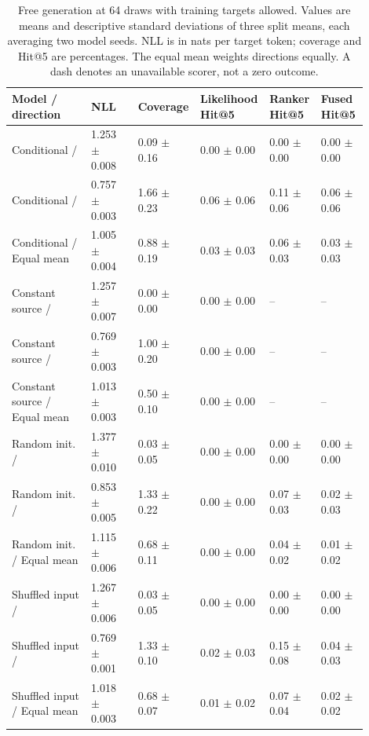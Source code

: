 \begin{table}[ht]
\centering
\caption{Free generation at 64 draws with training targets allowed. Values are means and descriptive standard deviations of three split means, each averaging two model seeds. NLL is in nats per target token; coverage and Hit@5 are percentages. The equal mean weights directions equally. A dash denotes an unavailable scorer, not a zero outcome.}
\label{tab:primary}
\small
\setlength{\tabcolsep}{3pt}
\begin{tabular}{p{0.2200\linewidth}p{0.1360\linewidth}p{0.1360\linewidth}p{0.1360\linewidth}p{0.1360\linewidth}p{0.1360\linewidth}}
\toprule
Model / direction & NLL & Coverage & Likelihood Hit@5 & Ranker Hit@5 & Fused Hit@5\\
\midrule
Conditional / \gtd{} & 1.253 $\pm$ 0.008 & 0.09 $\pm$ 0.16 & 0.00 $\pm$ 0.00 & 0.00 $\pm$ 0.00 & 0.00 $\pm$ 0.00\\
Conditional / \dtg{} & 0.757 $\pm$ 0.003 & 1.66 $\pm$ 0.23 & 0.06 $\pm$ 0.06 & 0.11 $\pm$ 0.06 & 0.06 $\pm$ 0.06\\
Conditional / Equal mean & 1.005 $\pm$ 0.004 & 0.88 $\pm$ 0.19 & 0.03 $\pm$ 0.03 & 0.06 $\pm$ 0.03 & 0.03 $\pm$ 0.03\\
Constant source / \gtd{} & 1.257 $\pm$ 0.007 & 0.00 $\pm$ 0.00 & 0.00 $\pm$ 0.00 & -- & --\\
Constant source / \dtg{} & 0.769 $\pm$ 0.003 & 1.00 $\pm$ 0.20 & 0.00 $\pm$ 0.00 & -- & --\\
Constant source / Equal mean & 1.013 $\pm$ 0.003 & 0.50 $\pm$ 0.10 & 0.00 $\pm$ 0.00 & -- & --\\
Random init. / \gtd{} & 1.377 $\pm$ 0.010 & 0.03 $\pm$ 0.05 & 0.00 $\pm$ 0.00 & 0.00 $\pm$ 0.00 & 0.00 $\pm$ 0.00\\
Random init. / \dtg{} & 0.853 $\pm$ 0.005 & 1.33 $\pm$ 0.22 & 0.00 $\pm$ 0.00 & 0.07 $\pm$ 0.03 & 0.02 $\pm$ 0.03\\
Random init. / Equal mean & 1.115 $\pm$ 0.006 & 0.68 $\pm$ 0.11 & 0.00 $\pm$ 0.00 & 0.04 $\pm$ 0.02 & 0.01 $\pm$ 0.02\\
Shuffled input / \gtd{} & 1.267 $\pm$ 0.006 & 0.03 $\pm$ 0.05 & 0.00 $\pm$ 0.00 & 0.00 $\pm$ 0.00 & 0.00 $\pm$ 0.00\\
Shuffled input / \dtg{} & 0.769 $\pm$ 0.001 & 1.33 $\pm$ 0.10 & 0.02 $\pm$ 0.03 & 0.15 $\pm$ 0.08 & 0.04 $\pm$ 0.03\\
Shuffled input / Equal mean & 1.018 $\pm$ 0.003 & 0.68 $\pm$ 0.07 & 0.01 $\pm$ 0.02 & 0.07 $\pm$ 0.04 & 0.02 $\pm$ 0.02\\
\bottomrule
\end{tabular}
\end{table}
